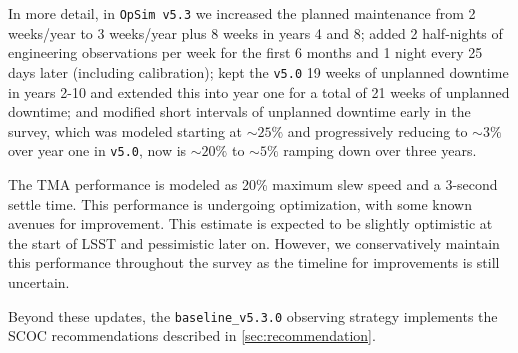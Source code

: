 \documentclass[SE,authoryear,toc]{lsstdoc}
\newcommand{\opsim}{\texttt{OpSim}}
\begin{document}
In more detail, in \opsim\ \texttt{v5.3} we increased the planned maintenance from 2 weeks/year to 3 weeks/year plus 8 weeks in years 4 and 8; added 2 half-nights of engineering observations per week for the first 6 months and 1 night every 25 days later (including calibration); kept the \texttt{v5.0} 19 weeks of unplanned downtime in years 2-10 and extended this into year one for a total of 21 weeks of unplanned downtime; and modified short intervals of unplanned downtime early in the survey, which was modeled starting at $\sim25\%$ and progressively reducing to $\sim3\%$ over year one in \texttt{v5.0}, now is $\sim20\%$ to $\sim5\%$ ramping down over three years. 


The TMA performance is modeled as 20\% maximum slew speed and a 3-second settle time. This performance is undergoing optimization, with some known avenues for improvement. This estimate is expected to be slightly optimistic at the start of LSST and pessimistic later on. However, we conservatively maintain this performance throughout the survey as the timeline for improvements is still uncertain.


Beyond these updates, the \texttt{baseline\_v5.3.0} observing strategy implements the SCOC recommendations described in \autoref{sec:recommendation}.

\end{document}
